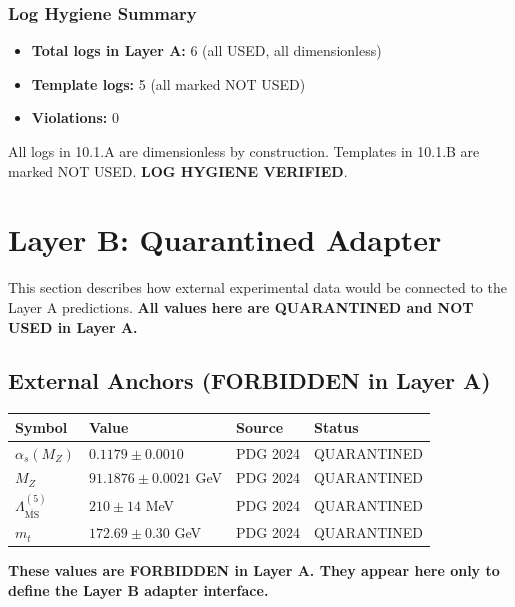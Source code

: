 \documentclass[11pt,a4paper]{article}
\theoremstyle{definition}
\begin{document}
\subsubsection{Log Hygiene Summary}
\label{subsubsec:log-summary}

\begin{canonbox}
\begin{itemize}
  \item \textbf{Total logs in Layer A:} 6 (all USED, all dimensionless)
  \item \textbf{Template logs:} 5 (all marked NOT USED)
  \item \textbf{Violations:} 0
\end{itemize}
All logs in 10.1.A are dimensionless by construction. Templates in 10.1.B are
marked NOT USED. \textbf{LOG HYGIENE VERIFIED}.
\end{canonbox}

\newpage

\section{Layer B: Quarantined Adapter}
\label{sec:layer-b}

\begin{layerbbox}
This section describes how external experimental data would be connected to
the Layer A predictions. \textbf{All values here are QUARANTINED and NOT USED
in Layer A.}
\end{layerbbox}

\subsection{External Anchors (FORBIDDEN in Layer A)}
\label{subsec:external-anchors}

\begin{forbiddenbox}
\begin{center}
\begin{tabular}{llll}
\toprule
\textbf{Symbol} & \textbf{Value} & \textbf{Source} & \textbf{Status} \\
\midrule
$\alpha_s(M_Z)$ & $0.1179 \pm 0.0010$ & PDG 2024 & QUARANTINED \\
$M_Z$ & $91.1876 \pm 0.0021$ GeV & PDG 2024 & QUARANTINED \\
$\Lambda_{\overline{\text{MS}}}^{(5)}$ & $210 \pm 14$ MeV & PDG 2024 & QUARANTINED \\
$m_t$ & $172.69 \pm 0.30$ GeV & PDG 2024 & QUARANTINED \\
\bottomrule
\end{tabular}
\end{center}
\textbf{These values are FORBIDDEN in Layer A. They appear here only to
define the Layer B adapter interface.}
\end{forbiddenbox}
\end{document}
